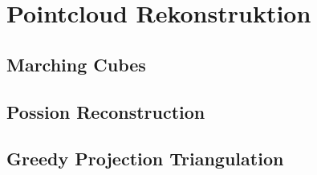 \section{Pointcloud Rekonstruktion}

\subsection{Marching Cubes}

\subsection{Possion Reconstruction}

\subsection{Greedy Projection Triangulation}

